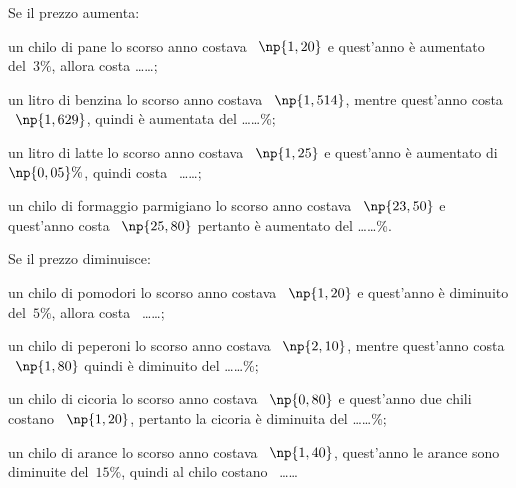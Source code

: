 \begin{esercizio}
 \label{ese:3.92}
Se il prezzo aumenta:
\begin{enumeratea}
 \item un chilo di pane lo scorso anno costava \officialeuro~$\np{1,20}$ e quest'anno è aumentato del~$3\%$, allora costa
\ldots\ldots;
 \item un litro di benzina lo scorso anno costava \officialeuro~$\np{1,514}$, mentre quest'anno costa \officialeuro~$\np{1,629}$, quindi è aumentata del \ldots\ldots\%;
 \item un litro di latte lo scorso anno costava \officialeuro~$\np{1,25}$ e quest'anno è aumentato di~$\np{0,05}\%$,
quindi costa \officialeuro~\ldots\ldots;
 \item un chilo di formaggio parmigiano lo scorso anno costava \officialeuro~$\np{23,50}$ e quest'anno costa \officialeuro~$\np{25,80}$ pertanto è aumentato del \ldots\ldots\%.
\end{enumeratea}
\end{esercizio}

\begin{esercizio}
 \label{ese:3.93}
Se il prezzo diminuisce:
\begin{enumeratea}
 \item un chilo di pomodori lo scorso anno costava \officialeuro~$\np{1,20}$ e quest'anno è diminuito del~$5\%$,
allora costa \officialeuro~\ldots\ldots;
 \item un chilo di peperoni lo scorso anno costava \officialeuro~$\np{2,10}$, mentre quest'anno costa \officialeuro~$\np{1,80}$ quindi è diminuito del \ldots\ldots\%;
 \item un chilo di cicoria lo scorso anno costava \officialeuro~$\np{0,80}$ e quest'anno due chili costano \officialeuro~$\np{1,20}$, pertanto la cicoria è diminuita del \ldots\ldots\%;
 \item un chilo di arance lo scorso anno costava \officialeuro~$\np{1,40}$, quest'anno le arance sono diminuite del~$15\%$,
quindi al chilo costano \officialeuro~\ldots\ldots
\end{enumeratea}
\end{esercizio}

